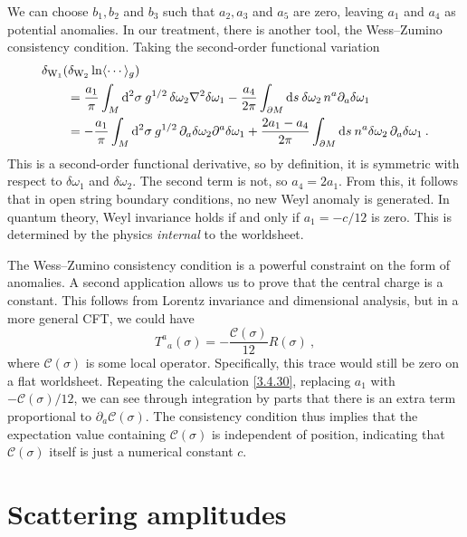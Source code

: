We can choose $b_{1}, b_{2}$ and $b_{3}$ such that $a_{2}, a_{3}$ and $a_{5}$ are zero, leaving $a_{1}$ and $a_{4}$ as potential anomalies. In our treatment, there is another tool, the Wess–Zumino consistency condition.    
Taking the second-order functional variation    
\begin{align}
	&\delta_{\mathrm{W}_{1}}(\delta_{\mathrm{W}_{2}} \ln \langle\cdots\rangle_{g}) \nonumber \\
	&\qquad=\frac{a_{1}}{\pi} \int_{M} \mathrm{d}^{2} \sigma\: g^{1 / 2}\, \delta \omega_{2} \nabla^{2} \delta \omega_{1}-\frac{a_{4}}{2 \pi} \int_{\partial M} \mathrm{d} s\: \delta \omega_{2} \, n^{a} \partial_{a} \delta \omega_{1} \nonumber \\
	&\qquad=-\frac{a_{1}}{\pi} \int_{M} \mathrm{d}^{2} \sigma\: g^{1 / 2} \,\partial_{a} \delta \omega_{2} \partial^{a} \delta \omega_{1}+\frac{2 a_{1}-a_{4}}{2 \pi} \int_{\partial M} \mathrm{d} s\: n^{a} \delta \omega_{2}\, \partial_{a} \delta \omega_{1} \:.
	\label{3.4.30} \end{align}
This is a second-order functional derivative, so by definition, it is symmetric with respect to $\delta \omega_{1}$ and $\delta \omega_{2}$. The second term is not, so $a_4=2a_1$. From this, it follows that in open string boundary conditions, no new Weyl anomaly is generated. In quantum theory, Weyl invariance holds if and only if $a_{1}=-c / 12$ is zero. This is determined by the physics \emph{internal} to the worldsheet.    

The Wess–Zumino consistency condition is a powerful constraint on the form of anomalies. A second application allows us to prove that the central charge is a constant.    
This follows from Lorentz invariance and dimensional analysis, but in a more general CFT, we could have    
\begin{equation}
	T^{a}{}_{a}(\sigma)=-\frac{\mathscr{C}(\sigma)}{12} R(\sigma) \:, \label{3.4.31}
\end{equation}
where $\mathscr{C}(\sigma)$ is some local operator. Specifically, this trace would still be zero on a flat worldsheet. Repeating the calculation \eqref{3.4.30}, replacing $a_{1}$ with $-\mathscr{C}(\sigma) / 12$, we can see through integration by parts that there is an extra term proportional to $\partial_{a} \mathscr{C}(\sigma)$.    
The consistency condition thus implies that the expectation value containing $\mathscr{C}(\sigma)$ is independent of position, indicating that $\mathscr{C}(\sigma)$ itself is just a numerical constant $c$.    

\section{\texorpdfstring{Scattering amplitudes}{3.5 Scattering amplitudes}} \label{sec:3.5}

